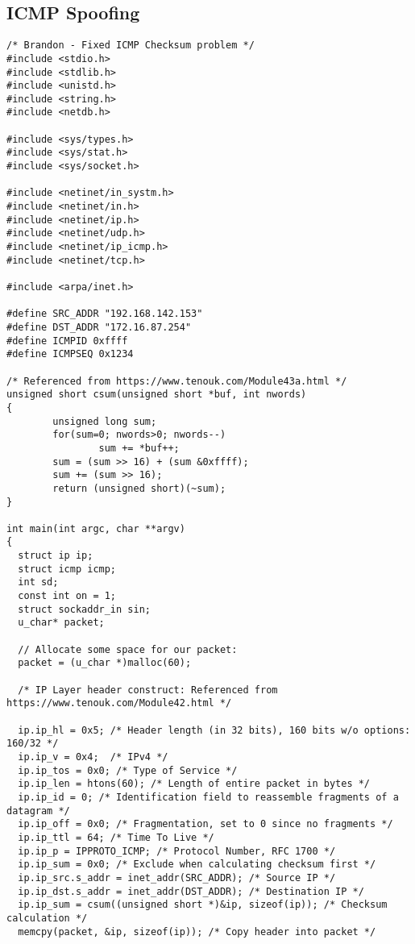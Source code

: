 \documentclass[a4paper,12pt]{article}
\begin{document}
\subsection{ICMP Spoofing}
\label{ch:ICMPSpoof}
\begin{verbatim}
/* Brandon - Fixed ICMP Checksum problem */
#include <stdio.h>
#include <stdlib.h>
#include <unistd.h>
#include <string.h>
#include <netdb.h>

#include <sys/types.h>
#include <sys/stat.h>
#include <sys/socket.h>

#include <netinet/in_systm.h>
#include <netinet/in.h>
#include <netinet/ip.h>
#include <netinet/udp.h>
#include <netinet/ip_icmp.h>
#include <netinet/tcp.h>

#include <arpa/inet.h>

#define SRC_ADDR "192.168.142.153"
#define DST_ADDR "172.16.87.254"
#define ICMPID 0xffff
#define ICMPSEQ 0x1234

/* Referenced from https://www.tenouk.com/Module43a.html */
unsigned short csum(unsigned short *buf, int nwords)
{
        unsigned long sum;
        for(sum=0; nwords>0; nwords--)
                sum += *buf++;
        sum = (sum >> 16) + (sum &0xffff);
        sum += (sum >> 16);
        return (unsigned short)(~sum);
}

int main(int argc, char **argv)
{
  struct ip ip;
  struct icmp icmp;
  int sd;
  const int on = 1;
  struct sockaddr_in sin;
  u_char* packet;

  // Allocate some space for our packet:
  packet = (u_char *)malloc(60);
  
  /* IP Layer header construct: Referenced from https://www.tenouk.com/Module42.html */

  ip.ip_hl = 0x5; /* Header length (in 32 bits), 160 bits w/o options: 160/32 */
  ip.ip_v = 0x4;  /* IPv4 */
  ip.ip_tos = 0x0; /* Type of Service */
  ip.ip_len = htons(60); /* Length of entire packet in bytes */
  ip.ip_id = 0; /* Identification field to reassemble fragments of a datagram */
  ip.ip_off = 0x0; /* Fragmentation, set to 0 since no fragments */
  ip.ip_ttl = 64; /* Time To Live */
  ip.ip_p = IPPROTO_ICMP; /* Protocol Number, RFC 1700 */
  ip.ip_sum = 0x0; /* Exclude when calculating checksum first */
  ip.ip_src.s_addr = inet_addr(SRC_ADDR); /* Source IP */
  ip.ip_dst.s_addr = inet_addr(DST_ADDR); /* Destination IP */
  ip.ip_sum = csum((unsigned short *)&ip, sizeof(ip)); /* Checksum calculation */
  memcpy(packet, &ip, sizeof(ip)); /* Copy header into packet */
  

\end{verbatim}
\end{document}
